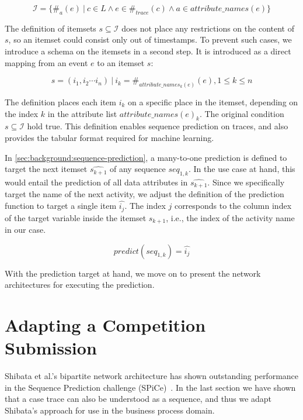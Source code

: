 $$\mathscr{I} = \{\#_{a}(e)\ |\ c \in L\wedge e \in \#_{trace}(c) \wedge a \in attribute\_names(e)\}$$

The definition of itemsets $s \subseteq \mathscr{I}$ does not place any restrictions on the content of $s$,
so an itemset could consist only out of timestamps.
To prevent such cases, we introduce a schema on the itemsets in a second step.
It is introduced as a direct mapping from an event $e$ to an itemset $s$:

$$ s = (i_1, i_2 \cdots i_n)\ |\ i_k = \#_{attribute\_names_k(e)}(e), 1 \leq k \leq n $$

The definition places each item $i_k$ on a specific place in the itemset, depending on the index $k$ in the attribute list $attribute\_names(e)_k$.
The original condition $s \subseteq \mathscr{I}$ hold true.
This definition enables sequence prediction on traces, and also provides the tabular format required for machine learning.

In \autoref{sec:background:sequence-prediction}, a many-to-one prediction is defined to target the next itemset $\widehat{s_{k+1}}$ of any sequence $seq_{1,k}$.
In the use case at hand, this would entail the prediction of all data attributes in $\widehat{s_{k+1}}$.
Since we specifically target the name of the next activity, we adjust the definition of the prediction function to target a single item $\hat{i_j}$.
The index $j$ corresponds to the column index of the target variable inside the itemset $s_{k+1}$, i.e., the index of the activity name in our case.

$$ predict(seq_{1,k}) = \hat{i_j} $$

With the prediction target at hand, we move on to present the network architectures for executing the prediction.

\section{Adapting a Competition Submission}\label{sec:contrib:sp2-inspiration}
Shibata et al.'s bipartite network architecture has shown outstanding performance in the Sequence Prediction challenge (SPiCe)~\cite{web:spice}.
In the last section we have shown that a case trace can also be understood as a sequence, and thus we adapt Shibata's approach for use in the business process domain.

